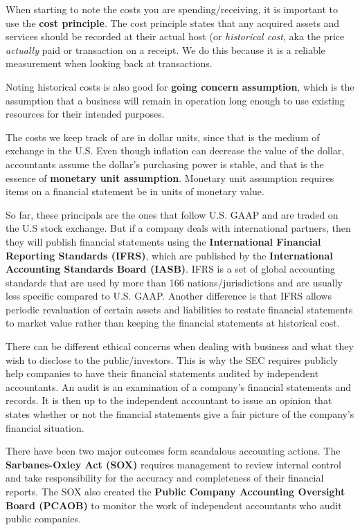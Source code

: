 \documentclass[a4paper, 12pt]{article}
\begin{document}
When starting to note the costs you are spending/receiving, it is important to
use the \textbf{cost principle}. The cost principle states that any acquired
assets and services should be recorded at their actual host (or \emph{
historical cost}, aka the price \emph{actually} paid or transaction on a receipt.
We do this because it is a reliable measurement when looking back at transactions.

Noting historical costs is also good for \textbf{going concern assumption}, which
is the assumption that a business will remain in operation long enough to use
existing resources for their intended purposes.

The costs we keep track of are in dollar units, since that is the medium of 
exchange in the U.S. Even though inflation can decrease the value of the dollar,
accountants assume the dollar's purchasing power is stable, and that is the essence
of \textbf{monetary unit assumption}. Monetary unit assumption requires items
on a financial statement be in units of monetary value.

So far, these principals are the ones that follow U.S. GAAP and are traded on
the U.S stock exchange. But if a company deals with international partners, then
they will publish financial statements using the \textbf{International Financial
Reporting Standards (IFRS)}, which are published by the \textbf{International
Accounting Standards Board (IASB)}. IFRS is a set of global accounting standards
that are used by more than 166 nations/jurisdictions and are usually less specific
compared to U.S. GAAP. Another difference is that IFRS allows periodic revaluation
of certain assets and liabilities to restate financial statements to market value
rather than keeping the financial statements at historical cost.

There can be different ethical concerns when dealing with business and what they
wish to disclose to the public/investors. This is why the SEC requires publicly
help companies to have their financial statements audited by independent
accountants. An audit is an examination of a company's financial statements and
records. It is then up to the independent accountant to issue an opinion that 
states whether or not the financial statements give a fair picture of the 
company's financial situation.

There have been two major outcomes form scandalous accounting actions. The
\textbf{Sarbanes-Oxley Act (SOX)} requires management to review internal control
and take responsibility for the accuracy and completeness of their financial
reports. The SOX also created the \textbf{Public Company Accounting Oversight Board
(PCAOB)} to monitor the work of independent accountants who audit public companies.
\end{document}
